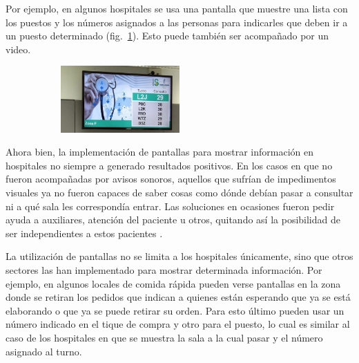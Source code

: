 \documentclass[twoside]{article}
\begin{document}
Por ejemplo, en algunos hospitales se usa una pantalla que muestre una lista con los puestos y los números asignados a las personas para indicarles que deben ir a un puesto determinado (fig.~\ref{fig:hospital}). Esto puede también ser acompañado por un video. 
\begin{figure}[H]
	\caption{Hospital con pantalla para distribuir pacientes}
    \begin{subfigure}{1.0\textwidth}
	\includegraphics[width=0.5\textwidth]{hospital.png}
    \end{subfigure}
	\label{fig:hospital}
\end{figure}
\vspace{-1.0\baselineskip}
Ahora bien, la implementación de pantallas para mostrar información en hospitales no siempre a generado resultados positivos. En los casos en que no fueron acompañadas por avisos sonoros, aquellos que sufrían de impedimentos visuales ya no fueron capaces de saber cosas como dónde debían pasar a consultar ni a qué sala les correspondía entrar. Las soluciones en ocasiones fueron pedir ayuda a auxiliares, atención del paciente u otros, quitando así la posibilidad de ser independientes a estos pacientes \parencite{pantallasChange}.

La utilización de pantallas no se limita a los hospitales únicamente, sino que otros sectores las han implementado para mostrar determinada información. Por ejemplo, en algunos locales de comida rápida pueden verse pantallas en la zona donde se retiran los pedidos que indican a quienes están esperando que ya se está elaborando o que ya se puede retirar su orden. Para esto último pueden usar un número indicado en el tique de compra y otro para el puesto, lo cual es similar al caso de los hospitales en que se muestra la sala a la cual pasar y el número asignado al turno.
\end{document}
